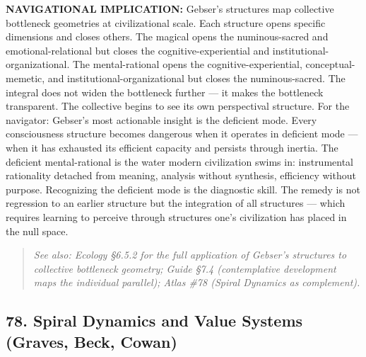 \textbf{NAVIGATIONAL IMPLICATION:} Gebser's structures map collective bottleneck geometries at civilizational scale. Each structure opens specific dimensions and closes others. The magical opens the numinous-sacred and emotional-relational but closes the cognitive-experiential and institutional-organizational. The mental-rational opens the cognitive-experiential, conceptual-memetic, and institutional-organizational but closes the numinous-sacred. The integral does not widen the bottleneck further — it makes the bottleneck transparent. The collective begins to see its own perspectival structure. For the navigator: Gebser's most actionable insight is the deficient mode. Every consciousness structure becomes dangerous when it operates in deficient mode — when it has exhausted its efficient capacity and persists through inertia. The deficient mental-rational is the water modern civilization swims in: instrumental rationality detached from meaning, analysis without synthesis, efficiency without purpose. Recognizing the deficient mode is the diagnostic skill. The remedy is not regression to an earlier structure but the integration of all structures — which requires learning to perceive through structures one's civilization has placed in the null space.


\begin{quote}
\itshape
\textit{See also: Ecology §6.5.2 for the full application of Gebser's structures to collective bottleneck geometry; Guide §7.4 (contemplative development maps the individual parallel); Atlas \#78 (Spiral Dynamics as complement).}
\end{quote}


\bigskip\noindent\makebox[\textwidth]{\color{rulegray}\rule{5cm}{0.3pt}}\bigskip


\subsection*{78. Spiral Dynamics and Value Systems (Graves, Beck, Cowan)}


